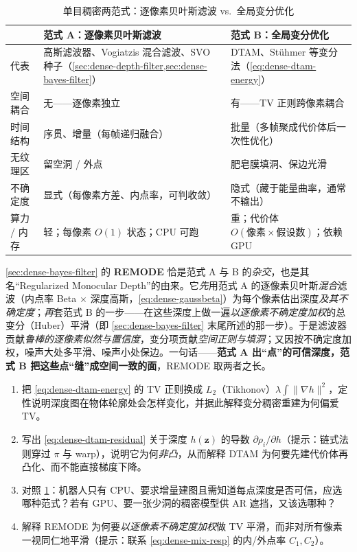\begin{table}[H]\centering\small
\caption{单目稠密两范式：逐像素贝叶斯滤波 vs.\ 全局变分优化}
\label{tab:dense-paradigm}
\begin{tabular}{p{} p{} p{}}
\toprule
 & 范式 A：逐像素贝叶斯滤波 & 范式 B：全局变分优化 \\
\midrule
代表 & 高斯滤波器、Vogiatzis 混合滤波、SVO 种子（\cref{sec:dense-depth-filter,sec:dense-bayes-filter}）& DTAM、Stühmer 等变分法（\cref{eq:dense-dtam-energy}）\\
空间耦合 & 无——逐像素独立 & 有——TV 正则跨像素耦合 \\
时间结构 & 序贯、增量（每帧递归融合）& 批量（多帧聚成代价体后一次性优化）\\
无纹理区 & 留空洞 / 外点 & 肥皂膜填洞、保边光滑 \\
不确定度 & 显式（每像素方差、内点率，可判收敛）& 隐式（藏于能量曲率，通常不输出）\\
算力 / 内存 & 轻；每像素 $O(1)$ 状态；CPU 可跑 & 重；代价体 $O(\text{像素}\!\times\!\text{假设数})$；依赖 GPU \\
\bottomrule
\end{tabular}
\end{table}

\begin{insight}
\cref{sec:dense-bayes-filter} 的 \textbf{REMODE}\cite{pizzoli2014remode} 恰是范式 A 与 B 的\emph{杂交}，也是其名“Regularized Monocular Depth”的由来。它\emph{先}用范式 A 的逐像素贝叶斯\emph{混合}滤波（内点率 Beta $\times$ 深度高斯，\cref{eq:dense-gaussbeta}）为每个像素估出深度\emph{及其不确定度}；\emph{再}套范式 B 的一步——在这些深度上做一遍\emph{以逐像素不确定度加权}的总变分（Huber）平滑（即 \cref{sec:dense-bayes-filter} 末尾所述的那一步）。于是滤波器贡献\emph{鲁棒的逐像素似然与置信度}，变分项贡献\emph{空间正则与填洞}；又因按不确定度加权，噪声大处多平滑、噪声小处保边。一句话——\textbf{范式 A 出“点”的可信深度，范式 B 把这些点“缝”成空间一致的面}，REMODE 取两者之长。
\end{insight}

\begin{practice}[练习]
\begin{enumerate}
  \item 把 \cref{eq:dense-dtam-energy} 的 TV 正则换成 $L_2$（Tikhonov）$\lambda\int\|\nabla h\|^2$，定性说明深度图在物体轮廓处会怎样变化，并据此解释变分稠密重建为何偏爱 TV。
  \item 写出 \cref{eq:dense-dtam-residual} 关于深度 $h(\mathbf{z})$ 的导数 $\partial\rho_i/\partial h$（提示：链式法则穿过 $\pi$ 与 warp），说明它为何\emph{非凸}，从而解释 DTAM 为何要先建代价体再凸化、而不能直接梯度下降。
  \item 对照 \cref{tab:dense-paradigm}：机器人只有 CPU、要求增量建图且需知道每点深度是否可信，应选哪种范式？若有 GPU、要一张少洞的稠密模型供 AR 遮挡，又该选哪种？
  \item 解释 REMODE 为何要\emph{以逐像素不确定度加权}做 TV 平滑，而非对所有像素一视同仁地平滑（提示：联系 \cref{eq:dense-mix-resp} 的内/外点率 $C_1,C_2$）。
\end{enumerate}
\end{practice}

